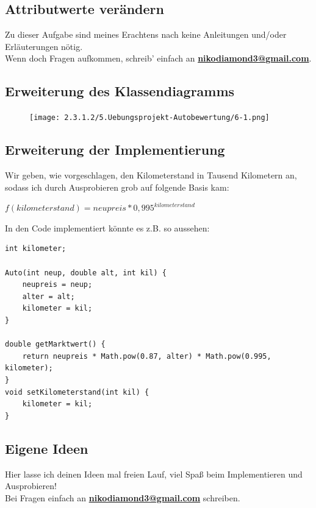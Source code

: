 \documentclass{scrartcl}   %
\begin{document}
\subsection{Attributwerte verändern}

Zu dieser Aufgabe sind meines Erachtens nach keine Anleitungen und/oder Erläuterungen nötig.\\
Wenn doch Fragen aufkommen, schreib' einfach an \textbf{\href{mailto:nikodiamond3@gmail.com}{nikodiamond3@gmail.com}}.

\subsection{Erweiterung des Klassendiagramms}

\begin{figure}[ht]
	\centering
	\texttt{[image: 2.3.1.2/5.Uebungsprojekt-Autobewertung/6-1.png]}
\end{figure}

\subsection{Erweiterung der Implementierung}

Wir geben, wie vorgeschlagen, den Kilometerstand in \glqq Tausend Kilometern\grqq{} an, sodass ich durch Ausprobieren grob auf folgende Basis kam:

\begin{center}
    \texttt{$f(kilometerstand) = neupreis * 0,995^{kilometerstand}$}
\end{center}

In den Code implementiert könnte es z.B. so aussehen:

\begin{lstlisting}
int kilometer;

Auto(int neup, double alt, int kil) {
    neupreis = neup;
    alter = alt;
    kilometer = kil;
}

double getMarktwert() {
    return neupreis * Math.pow(0.87, alter) * Math.pow(0.995, kilometer);
}
void setKilometerstand(int kil) {
    kilometer = kil;
}
\end{lstlisting}

\subsection{Eigene Ideen}

Hier lasse ich deinen Ideen mal freien Lauf, viel Spaß beim Implementieren und Ausprobieren!\\
Bei Fragen einfach an \textbf{\href{mailto:nikodiamond3@gmail.com}{nikodiamond3@gmail.com}} schreiben.
\end{document}
